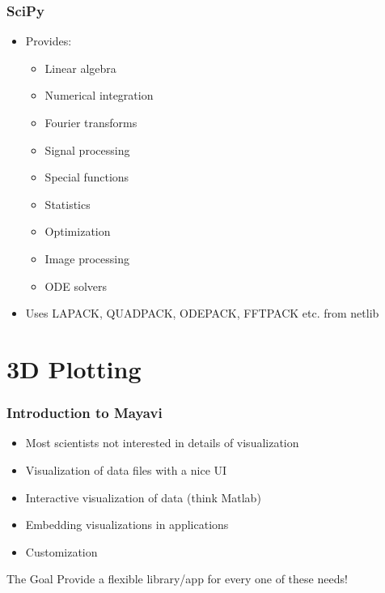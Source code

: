 \documentclass[14pt,compress]{beamer}
\begin{document}
\begin{frame}
  \frametitle{SciPy}
  \begin{itemize}
  \item Provides:
    \begin{itemize}
    \item Linear algebra
    \item Numerical integration
    \item Fourier transforms
    \item Signal processing
    \item Special functions
    \item Statistics
    \item Optimization
    \item Image processing
    \item ODE solvers
    \end{itemize}
  \item Uses LAPACK, QUADPACK, ODEPACK, FFTPACK etc. from netlib
  \end{itemize}
\end{frame}


\section{3D Plotting}

\begin{frame}
  \frametitle{Introduction to Mayavi}
  \begin{itemize}
  \item Most scientists not interested in details of visualization
  \item Visualization of data files with a nice UI
  \item Interactive visualization of data (think Matlab)
  \item Embedding visualizations in applications
  \item Customization
  \end{itemize}
  \pause
  \begin{block}{The Goal}
      Provide a \alert{flexible} library/app for every one of these needs!
  \end{block}
\end{frame}
\end{document}
